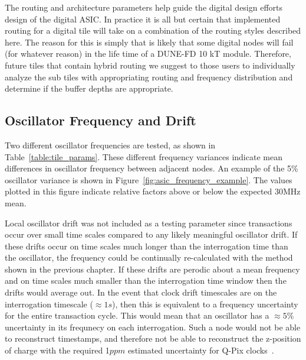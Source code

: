 The routing and architecture parameters help guide the digital design efforts design of the digital ASIC.
In practice it is all but certain that implemented routing for a digital tile will take on a combination of the routing styles described here.
The reason for this is simply that is likely that some digital nodes will fail (for whatever reason) in the life time of a DUNE-FD 10 kT module.
Therefore, future tiles that contain hybrid routing we suggest to those users to individually analyze the sub tiles with appropriating routing and frequency distribution and determine if the buffer depths are appropriate.

\subsection{Oscillator Frequency and Drift}

Two different oscillator frequencies are tested, as shown in Table~\ref{table:tile_params}.
These different frequency variances indicate mean differences in oscillator frequency between adjacent nodes.
An example of the 5\% oscillator variance is shown in Figure~\ref{fig:asic_frequency_example}.
The values plotted in this figure indicate relative factors above or below the expected 30\unit{MHz} mean.

Local oscillator drift was not included as a testing parameter since transactions occur over small time scales compared to any likely meaningful oscillator drift.
If these drifts occur on time scales much longer than the interrogation time than the oscillator, the frequency could be continually re-calculated with the method shown in the previous chapter.
If these drifts are perodic about a mean frequency and on time scales much smaller than the interrogation time window then the drifts would average out.
In the event that clock drift timescales are on the interrogation timescale ($\approx 1\unit{s}$), then this is equivalent to a frequency uncertainty for the entire transaction cycle.
This would mean that an oscillator has a $\approx 5\%$ uncertainty in its frequnecy on each interrogation.
Such a node would not be able to reconstruct timestamps, and therefore not be able to reconstruct the z-position of charge with the required 1$\unit{ppm}$ estimated uncertainty for Q-Pix clocks~\citep{qpix:nygren:mei}.

